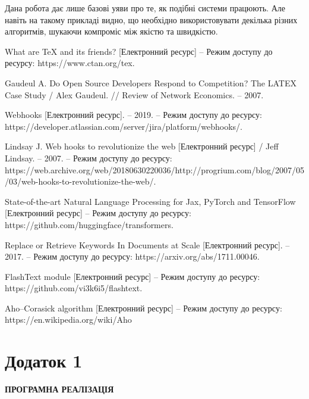 \documentclass[a4paper,14pt]{extreport}
\newcommand\chap[1]{%
  \chapter*{#1}%
  \addcontentsline{toc}{chapter}{\uppercase{#1}}}
\begin{document}
    Дана робота дає лише базові уяви про те, як подібні системи працюють. Але навіть на такому прикладі видно, що необхідно використовувати декілька різних алгоритмів, шукаючи компроміс між якістю та швидкістю.

\newpage
\renewcommand\bibname{ПЕРЕЛІК ДЖЕРЕЛ ПОСИЛАННЯ}
\begin{thebibliography}{9}
    What are TeX and its friends? [Електронний ресурс] – Режим доступу до ресурсу: https://www.ctan.org/tex.

    Gaudeul A. Do Open Source Developers Respond to Competition? The LATEX Case Study / Alex Gaudeul. // Review of Network Economics. – 2007.

    Webhooks [Електронний ресурс]. – 2019. – Режим доступу до ресурсу: https://developer.atlassian.com/server/jira/platform/webhooks/.

    Lindsay J. Web hooks to revolutionize the web [Електронний ресурс] / Jeff Lindsay. – 2007. – Режим доступу до ресурсу: https://web.archive.org/web/20180630220036/http://progrium.com/blog/2007/05/03/web-hooks-to-revolutionize-the-web/.
    
    State-of-the-art Natural Language Processing for Jax, PyTorch and TensorFlow [Електронний ресурс] – Режим доступу до ресурсу: https://github.com/huggingface/transformers.

    Replace or Retrieve Keywords In Documents at Scale [Електронний ресурс]. – 2017. – Режим доступу до ресурсу: https://arxiv.org/abs/1711.00046.

    FlashText module [Електронний ресурс] – Режим доступу до ресурсу: https://github.com/vi3k6i5/flashtext.

    Aho–Corasick algorithm [Електронний ресурс] – Режим доступу до ресурсу: https://en.wikipedia.org/wiki/Aho%
\end{thebibliography}


\newpage

\chap{Додаток 1}
\centerline{\uppercase{\bf{Програмна реалізація}}}
    \inputminted[breaklines,linenos=true]{python}{../../src/app.py}
\end{document}
